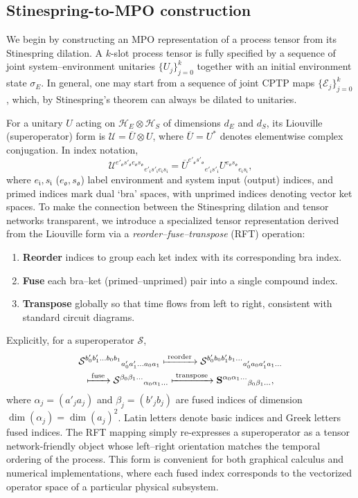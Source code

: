 \documentclass[
    aps,
    prx,
    reprint,
    superscriptaddress,
    longbibliography,
    nofootinbib,
    floatfix,
]{revtex4-2}
\newcommand{\inp}{\mathfrak{i}}
\newcommand{\out}{\mathfrak{o}}
\begin{document}
\subsection{Stinespring-to-MPO construction}
We begin by constructing an MPO representation of a process tensor from its Stinespring dilation. A \(k\)-slot process tensor is fully specified by a sequence of joint system--environment unitaries \(\{U_j\}_{j=0}^k\) together with an initial environment state \(\sigma_E\). In general, one may start from a sequence of joint CPTP maps \(\{\mathcal{E}_j\}_{j=0}^k\), which, by Stinespring's theorem can always be dilated to unitaries.

For a unitary \(U\) acting on \(\mathcal{H}_E \otimes \mathcal{H}_S\) of dimensions \(d_E\) and \(d_S\), its Liouville (superoperator) form is \(\mathcal{U} = \overline{U} \otimes U\), where \(\overline{U} = U^*\) denotes elementwise complex conjugation. In index notation,
\begin{equation}
    \mathcal{U}^{e'_\out s'_\out e_\out s_\out}{}_{e'_\inp s'_\inp e_\inp s_\inp} = \overline{U}^{e'_\out s'_\out}{}_{e'_\inp s'_\inp} U^{e_\out s_\out}{}_{e_\inp s_\inp},
\end{equation}
where \(e_\inp, s_\inp\) (\(e_\out, s_\out\)) label environment and system input (output) indices, and primed indices mark dual `bra' spaces, with unprimed indices denoting vector ket spaces. To make the connection between the Stinespring dilation and tensor networks transparent, we introduce a specialized tensor representation derived from the Liouville form via a \emph{reorder--fuse--transpose} (RFT) operation:
\begin{enumerate}
    \item \textbf{Reorder} indices to group each ket index with its corresponding bra index.
    \item \textbf{Fuse} each bra--ket (primed--unprimed) pair into a single compound index.
    \item \textbf{Transpose} globally so that time flows from left to right, consistent with standard circuit diagrams.
\end{enumerate}
Explicitly, for a superoperator \(\mathcal{S}\),
\begin{multline}\label{eq:rft}
    \mathcal{S}^{b'_0 b'_1 \dots b_0 b_1}{}_{a'_0 a'_1 \dots a_0 a_1} 
    \xmapsto{\;\text{reorder}\;}
    \mathcal{S}^{b'_0 b_0 b'_1 b_1 \dots}{}_{a'_0 a_0 a'_1 a_1 \dots} \\
    \xmapsto{\;\text{fuse}\;}
    \mathcal{S}^{\beta_0 \beta_1 \dots}{}_{\alpha_0 \alpha_1 \dots} 
    \xmapsto{\;\text{transpose}\;}
    \mathbf{S}^{\alpha_0 \alpha_1 \dots}{}_{\beta_0 \beta_1 \dots},
\end{multline}
where \(\alpha_j = (a'_j a_j)\) and \(\beta_j = (b'_j b_j)\) are fused indices of dimension \(\dim(\alpha_j) = \dim(a_j)^2\). Latin letters denote basic indices and Greek letters fused indices. The RFT mapping simply re-expresses a superoperator as a tensor network-friendly object whose left--right orientation matches the temporal ordering of the process. This form is convenient for both graphical calculus and numerical implementations, where each fused index corresponds to the vectorized operator space of a particular physical subsystem.
\end{document}
